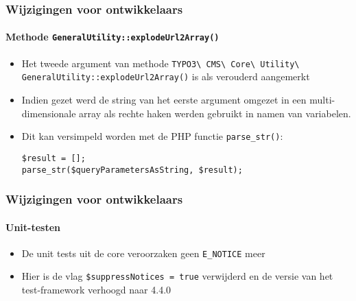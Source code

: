 \begin{frame}[fragile]
	\frametitle{Wijzigingen voor ontwikkelaars}
	\framesubtitle{Methode \texttt{GeneralUtility::explodeUrl2Array()}}

	\begin{itemize}
		\item Het tweede argument van methode
			\smaller
				\texttt{TYPO3\textbackslash
					CMS\textbackslash
					Core\textbackslash
					Utility\textbackslash
					GeneralUtility::explodeUrl2Array()}\newline
			\normalsize
			is als verouderd aangemerkt

		\item Indien gezet werd de string van het eerste argument omgezet in een
			multi-dimensionale array als rechte haken werden gebruikt in namen van
			variabelen.
		\item Dit kan versimpeld worden met de PHP functie \texttt{parse\_str()}:

			\begin{lstlisting}
$result = [];
parse_str($queryParametersAsString, $result);
			\end{lstlisting}

	\end{itemize}

\end{frame}


\begin{frame}[fragile]
	\frametitle{Wijzigingen voor ontwikkelaars}
	\framesubtitle{Unit-testen}

	\begin{itemize}
		\item De unit tests uit de core veroorzaken geen \texttt{E\_NOTICE} meer
		\item Hier is de vlag \texttt{\$suppressNotices = true} verwijderd en de versie
			van het test-framework verhoogd naar 4.4.0

	\end{itemize}

\end{frame}

